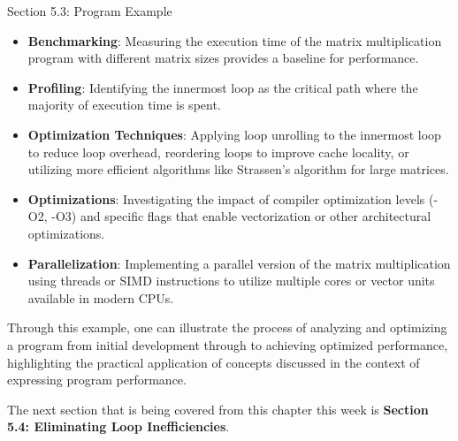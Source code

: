 \begin{notes}{Section 5.3: Program Example}
\begin{highlight}
        \begin{itemize}
            \item \textbf{Benchmarking}: Measuring the execution time of the matrix multiplication program with different matrix sizes provides a baseline for performance.
            \item \textbf{Profiling}: Identifying the innermost loop as the critical path where the majority of execution time is spent.
            \item \textbf{Optimization Techniques}: Applying loop unrolling to the innermost loop to reduce loop overhead, reordering loops to improve cache locality, or utilizing more efficient 
            algorithms like Strassen's algorithm for large matrices.
            \item \textbf{Optimizations}: Investigating the impact of compiler optimization levels (-O2, -O3) and specific flags that enable vectorization or other architectural optimizations.
            \item \textbf{Parallelization}: Implementing a parallel version of the matrix multiplication using threads or SIMD instructions to utilize multiple cores or vector units available in modern CPUs.
        \end{itemize}
    
    Through this example, one can illustrate the process of analyzing and optimizing a program from initial development through to achieving optimized performance, highlighting the practical application 
    of concepts discussed in the context of expressing program performance.
    \end{highlight}    
\end{notes}

The next section that is being covered from this chapter this week is \textbf{Section 5.4: Eliminating Loop Inefficiencies}.

